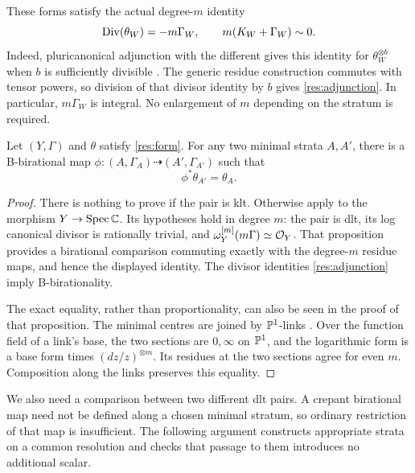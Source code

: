 These forms satisfy the actual degree-$m$ identity
\begin{equation}\label{res:adjunction}
 \operatorname{Div}(\theta_W)=-m\Gamma_W,
 \qquad m(K_W+\Gamma_W)\sim0.
\end{equation}
Indeed, pluricanonical adjunction with the different gives this identity
for $\theta_W^{\otimes b}$ when $b$ is sufficiently divisible
\citep[Definition~13]{KollarSources}.  The generic residue construction
commutes with tensor powers, so division of that divisor identity by
$b$ gives \eqref{res:adjunction}.  In particular, $m\Gamma_W$ is integral.
No enlargement of $m$ depending on the stratum is required.

\begin{lemma}\label{res:within}
 Let $(Y,\Gamma)$ and $\theta$ satisfy \eqref{res:form}.  For any two
 minimal strata $A,A'$, there is a B-birational map
 $\phi:(A,\Gamma_A)\dashrightarrow(A',\Gamma_{A'})$ such that
 \[
 \phi^*\theta_{A'}=\theta_A.
 \]
\end{lemma}

\begin{proof}
 There is nothing to prove if the pair is klt.  Otherwise apply
 \citet[Proposition~14]{KollarSources} to the morphism $Y\to\operatorname{Spec}\mathbb C$.
 Its hypotheses hold in degree $m$: the pair is dlt, its log canonical
 divisor is rationally trivial, and
 $\omega_Y^{[m]}(m\Gamma)\simeq\mathcal O_Y$.  That proposition provides a
 birational comparison commuting exactly with the degree-$m$ residue
 maps, and hence the displayed identity.  The divisor identities
 \eqref{res:adjunction} imply B-birationality.

 The exact equality, rather than proportionality, can also be seen in
 the proof of that proposition.  The minimal centres are joined by
 $\mathbb P^1$-links \citep[Theorem~10]{KollarSources}.  Over the function
 field of a link's base, the two sections are $0,\infty$ on $\mathbb P^1$,
 and the logarithmic form is a base form times $(dz/z)^{\otimes m}$.
 Its residues at the two sections agree for even $m$.  Composition
 along the links preserves this equality.
\end{proof}

We also need a comparison between two different dlt pairs.  A crepant
birational map need not be defined along a chosen minimal stratum, so
ordinary restriction of that map is insufficient.  The following
argument constructs appropriate strata on a common resolution and
checks that passage to them introduces no additional scalar.

